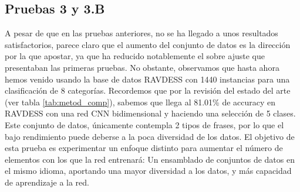 \documentclass[11pt,a4paper,spanish]{book}
\begin{document}
	\subsection{Pruebas 3 y 3.B} %
	A pesar de que en las pruebas anteriores, no se ha llegado a unos resultados satisfactorios, parece claro que el aumento del conjunto de datos es la dirección por la que apostar, ya que ha reducido notablemente el sobre ajuste que presentaban las primeras pruebas. No obstante, observamos que hasta ahora hemos venido usando la base de datos RAVDESS con 1440 instancias para una clasificación de 8 categorías. Recordemos que por la revisión del estado del arte (ver tabla \ref{tab:metod_comp}), sabemos que \cite{Mustaqeem2020} llega al 81.01\% de accuracy en RAVDESS con una red CNN bidimensional y haciendo una selección de 5 clases. Este conjunto de datos, únicamente contempla 2 tipos de frases, por lo que el bajo rendimiento puede deberse a la poca diversidad de los datos. 
	El objetivo de esta prueba es experimentar un enfoque distinto para aumentar el número de elementos con los que la red entrenará: Un ensamblado de conjuntos de datos en el mismo idioma, aportando una mayor diversidad a los datos, y más capacidad de aprendizaje a la red.
\end{document}

